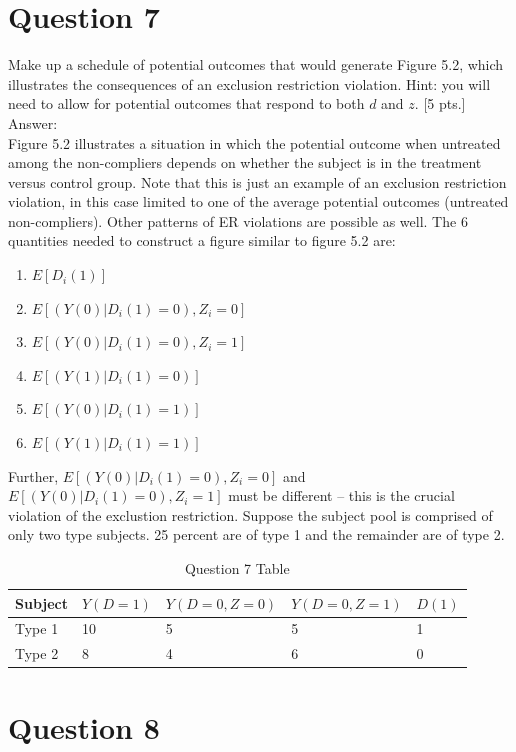 \documentclass[11pt,notitlepage]{article}\usepackage[]{graphicx}\usepackage[]{color}
\makeatletter
\newenvironment{kframe}{%
 \def\at@end@of@kframe{}%
 \ifinner\ifhmode%
  \def\at@end@of@kframe{\end{minipage}}%
  \begin{minipage}{\columnwidth}%
 \fi\fi%
 \def\FrameCommand##1{\hskip\@totalleftmargin \hskip-\fboxsep
 \colorbox{shadecolor}{##1}\hskip-\fboxsep
     \hskip-\linewidth \hskip-\@totalleftmargin \hskip\columnwidth}%
 \MakeFramed {\advance\hsize-\width
   \@totalleftmargin\z@ \linewidth\hsize
   \@setminipage}}%
 {\par\unskip\endMakeFramed%
 \at@end@of@kframe}
\newenvironment{knitrout}{}{} %
\makeatother
\begin{document}
\section*{Question 7}
Make up a schedule of potential outcomes that would generate Figure 5.2, which illustrates the consequences of an exclusion restriction violation. Hint: you will need to allow for potential outcomes that respond to both $d$ and $z$. [5 pts.]\\
Answer:\\
Figure 5.2 illustrates a situation in which the potential outcome when untreated among the non-compliers depends on whether the subject is in the treatment versus control group. Note that this is just an example of an exclusion restriction violation, in this case limited to one of the average potential outcomes (untreated non-compliers). Other patterns of ER violations are possible as well.
The 6 quantities needed to construct a figure similar to figure 5.2 are: 
\begin{enumerate}
\item $E[D_i(1)]$
\item $E[(Y(0)|D_i(1) = 0), Z_i = 0]$
\item $E[(Y(0)|D_i(1) = 0), Z_i = 1]$
\item $E[(Y(1)|D_i(1) = 0)]$
\item $E[(Y(0)|D_i(1) = 1)]$
\item $E[(Y(1)|D_i(1) = 1)]$
\end{enumerate}
Further, $E[(Y(0)|D_i(1) = 0), Z_i = 0]$ and $E[(Y(0)|D_i(1) = 0), Z_i = 1]$ must be different -- this is the crucial violation of the exclustion restriction. Suppose the subject pool is comprised of only two type subjects. 25 percent are of type 1 and the remainder are of type 2.

\begin{table}[H]
  \centering
  \caption{Question 7 Table}
    \begin{tabular}{lllll}
    \toprule
    Subject  & $Y(D=1)$ & $Y(D=0, Z=0)$ & $Y(D=0, Z=1)$ & $D(1)$ \\
    \midrule
    Type 1 & 10    & 5     & 5     & 1 \\
    Type 2 & 8     & 4     & 6     & 0 \\
    \bottomrule
    \end{tabular}%
  \label{tab:addlabel}%
\end{table}%

\section*{Question 8}
\begin{knitrout}
\color{fgcolor}\begin{kframe}
\begin{verbatim}





\end{verbatim}
\end{kframe}
\end{knitrout}
\end{document}
